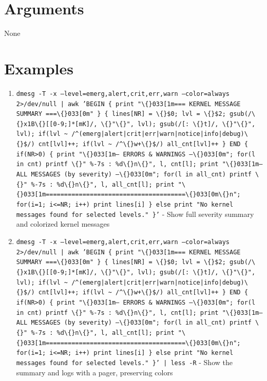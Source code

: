 \documentclass[openany]{book}
\begin{document}
\section*{Arguments}
None

\section*{Examples}
\begin{enumerate}
  \item \texttt{dmesg -T -x --level=emerg,alert,crit,err,warn --color=always 2>/dev/null | awk 'BEGIN \{ print "\textbackslash\{\}033[1m=== KERNEL MESSAGE SUMMARY ===\textbackslash\{\}033[0m" \} \{ lines[NR] = \textbackslash\{\}\$0; lvl = \textbackslash\{\}\$2; gsub(/\textbackslash\{\}x1B\textbackslash\{\}[[0-9;]*[mK]/, \textbackslash\{\}"\textbackslash\{\}", lvl); gsub(/[: \textbackslash\{\}t]/, \textbackslash\{\}"\textbackslash\{\}", lvl); if(lvl \textasciitilde{} /\textasciicircum{}(emerg|alert|crit|err|warn|notice|info|debug)\textbackslash\{\}\$/) cnt[lvl]++; if(lvl \textasciitilde{} /\textasciicircum{}\textbackslash\{\}w+\textbackslash\{\}\$/) all\_cnt[lvl]++ \} END \{ if(NR>0) \{ print "\textbackslash\{\}033[1m--- ERRORS \& WARNINGS ---\textbackslash\{\}033[0m"; for(l in cnt) printf \textbackslash\{\}"  \%-7s : \%d\textbackslash\{\}n\textbackslash\{\}", l, cnt[l]; print "\textbackslash\{\}033[1m--- ALL MESSAGES (by severity) ---\textbackslash\{\}033[0m"; for(l in all\_cnt) printf \textbackslash\{\}"  \%-7s : \%d\textbackslash\{\}n\textbackslash\{\}", l, all\_cnt[l]; print "\textbackslash\{\}033[1m======================================\textbackslash\{\}033[0m\textbackslash\{\}n"; for(i=1; i<=NR; i++) print lines[i] \} else print "No kernel messages found for selected levels." \}'} - Show full severity summary and colorized kernel messages
  \item \texttt{dmesg -T -x --level=emerg,alert,crit,err,warn --color=always 2>/dev/null | awk 'BEGIN \{ print "\textbackslash\{\}033[1m=== KERNEL MESSAGE SUMMARY ===\textbackslash\{\}033[0m" \} \{ lines[NR] = \textbackslash\{\}\$0; lvl = \textbackslash\{\}\$2; gsub(/\textbackslash\{\}x1B\textbackslash\{\}[[0-9;]*[mK]/, \textbackslash\{\}"\textbackslash\{\}", lvl); gsub(/[: \textbackslash\{\}t]/, \textbackslash\{\}"\textbackslash\{\}", lvl); if(lvl \textasciitilde{} /\textasciicircum{}(emerg|alert|crit|err|warn|notice|info|debug)\textbackslash\{\}\$/) cnt[lvl]++; if(lvl \textasciitilde{} /\textasciicircum{}\textbackslash\{\}w+\textbackslash\{\}\$/) all\_cnt[lvl]++ \} END \{ if(NR>0) \{ print "\textbackslash\{\}033[1m--- ERRORS \& WARNINGS ---\textbackslash\{\}033[0m"; for(l in cnt) printf \textbackslash\{\}"  \%-7s : \%d\textbackslash\{\}n\textbackslash\{\}", l, cnt[l]; print "\textbackslash\{\}033[1m--- ALL MESSAGES (by severity) ---\textbackslash\{\}033[0m"; for(l in all\_cnt) printf \textbackslash\{\}"  \%-7s : \%d\textbackslash\{\}n\textbackslash\{\}", l, all\_cnt[l]; print "\textbackslash\{\}033[1m======================================\textbackslash\{\}033[0m\textbackslash\{\}n"; for(i=1; i<=NR; i++) print lines[i] \} else print "No kernel messages found for selected levels." \}' | less -R} - Show the summary and logs with a pager, preserving colors

\end{enumerate}
\end{document}
